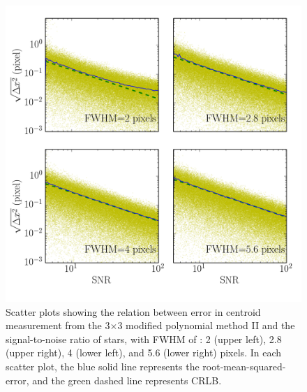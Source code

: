 \documentclass[12pt, preprint]{aastex}
\begin{document}
\begin{figure}[!htb]
  \includegraphics[width=\linewidth]{snr_psfpoly.png}
\endminipage
\caption{Scatter plots showing the relation between error in centroid
measurement from the 3$\times$3 modified polynomial method II and the signal-to-noise
ratio of stars, with FWHM of : 2 (upper left), 2.8 (upper right), 4 (lower left),
and 5.6 (lower right) pixels. In each scatter plot, the blue solid line represents the root-mean-squared-error, and the green dashed line represents CRLB.}\label{3}
\end{figure}
\end{document}
